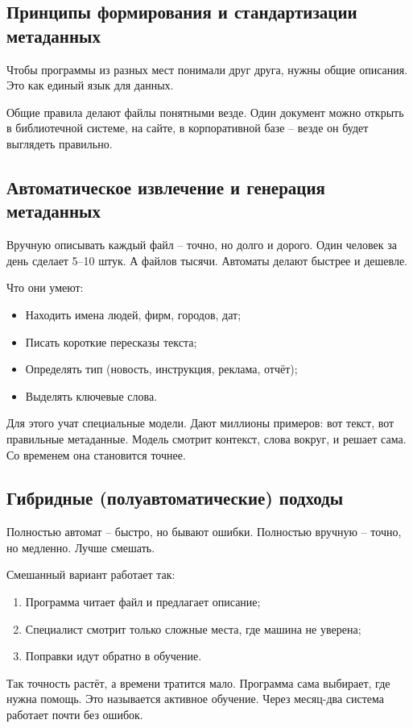 \documentclass{ou}
\begin{document}
\subsection{Принципы формирования и стандартизации метаданных}
Чтобы программы из разных мест понимали друг друга, нужны общие описания. Это как единый язык для данных.

Общие правила делают файлы понятными везде. Один документ можно открыть в библиотечной системе, на сайте, в корпоративной базе -- везде он будет выглядеть правильно.
\subsection{Автоматическое извлечение и генерация метаданных}
Вручную описывать каждый файл -- точно, но долго и дорого. Один человек за день сделает 5--10 штук. А файлов тысячи. Автоматы делают быстрее и дешевле.

Что они умеют:
\begin{itemize}[label=-, leftmargin=0em, itemindent=3.35em, nosep]
\item Находить имена людей, фирм, городов, дат;
\item Писать короткие пересказы текста;
\item Определять тип (новость, инструкция, реклама, отчёт);
\item Выделять ключевые слова.
\end{itemize}

Для этого учат специальные модели. Дают миллионы примеров: вот текст, вот правильные метаданные. Модель смотрит контекст, слова вокруг, и решает сама. Со временем она становится точнее.
\subsection{Гибридные (полуавтоматические) подходы}
Полностью автомат -- быстро, но бывают ошибки. Полностью вручную -- точно, но медленно. Лучше смешать.

Смешанный вариант работает так:
\begin{enumerate}[leftmargin=0em, itemindent=3.75em, nosep, label=\arabic*)]
\item Программа читает файл и предлагает описание;
\item Специалист смотрит только сложные места, где машина не уверена;
\item Поправки идут обратно в обучение.
\end{enumerate}

Так точность растёт, а времени тратится мало. Программа сама выбирает, где нужна помощь. Это называется активное обучение. Через месяц-два система работает почти без ошибок.
\end{document}
